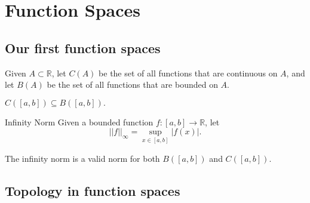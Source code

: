 \chapter{Function Spaces}

\section{Our first function spaces}

\begin{defn}{}{}
  Given \(A \subset \mathbb{R}\), let \(C(A)\) be the set of all functions that are continuous on  \(A\), and let \(B(A)\) be the set of all functions that are bounded on \(A\).
\end{defn}

\begin{prop}{}{}
  \(C([a, b]) \subseteq B([a, b]).\)
\end{prop}

\begin{defn}{Infinity Norm}{}
  Given a bounded function \(f\colon [a, b] \to \mathbb{R}\), let \[
    ||f||_\infty = \sup_{x \in [a, b]} |f(x)|.
  \] 
\end{defn}

The infinity norm is a valid norm for both \(B([a, b])\) and \(C([a, b])\).

\section{Topology in function spaces}
